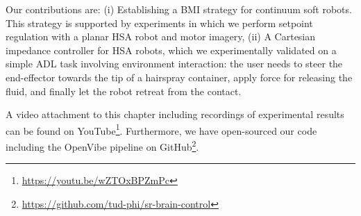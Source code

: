 Our contributions are: (i) Establishing a \gls{BMI} strategy for continuum soft robots. This strategy is supported by experiments in which we perform setpoint regulation with a planar \gls{HSA} robot and motor imagery, (ii) A Cartesian impedance controller for \gls{HSA} robots, which we experimentally validated on a simple \gls{ADL} task involving environment interaction: the user needs to steer the end-effector towards the tip of a hairspray container, apply force for releasing the fluid, and finally let the robot retreat from the contact.          

A video attachment to this chapter including recordings of experimental results can be found on YouTube\footnote{\url{https://youtu.be/wZTOxBPZmPc}}.
Furthermore, we have open-sourced our code including the OpenVibe pipeline on GitHub\footnote{\url{https://github.com/tud-phi/sr-brain-control}}.
